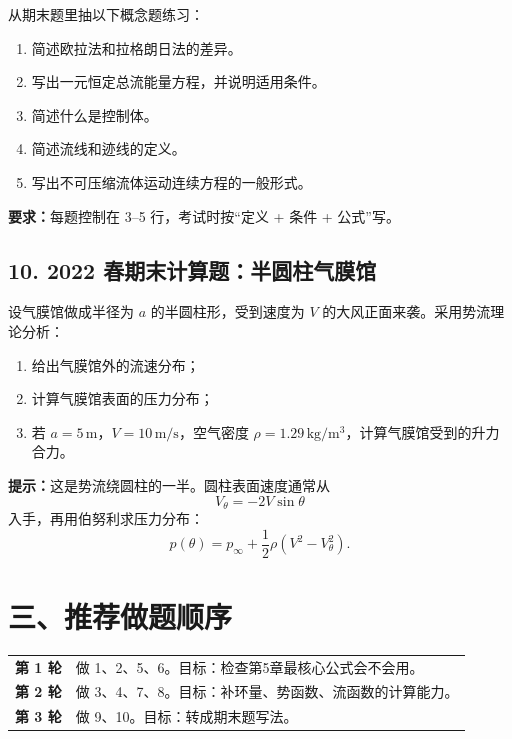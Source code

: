 \documentclass[UTF8,zihao=-4]{ctexart}
\newcommand{\task}[1]{\textbf{#1}}
\begin{document}
从期末题里抽以下概念题练习：

\begin{enumerate}[label=\arabic*.]
  \item 简述欧拉法和拉格朗日法的差异。
  \item 写出一元恒定总流能量方程，并说明适用条件。
  \item 简述什么是控制体。
  \item 简述流线和迹线的定义。
  \item 写出不可压缩流体运动连续方程的一般形式。
\end{enumerate}

\task{要求：}每题控制在 3--5 行，考试时按“定义 + 条件 + 公式”写。

\subsection*{10. 2022 春期末计算题：半圆柱气膜馆}

设气膜馆做成半径为 $a$ 的半圆柱形，受到速度为 $V$ 的大风正面来袭。采用势流理论分析：

\begin{enumerate}[label=(\alph*)]
  \item 给出气膜馆外的流速分布；
  \item 计算气膜馆表面的压力分布；
  \item 若 $a=5\,\mathrm{m}$，$V=10\,\mathrm{m/s}$，空气密度 $\rho=1.29\,\mathrm{kg/m^3}$，计算气膜馆受到的升力合力。
\end{enumerate}

\task{提示：}这是势流绕圆柱的一半。圆柱表面速度通常从
\[
V_\theta=-2V\sin\theta
\]
入手，再用伯努利求压力分布：
\[
p(\theta)=p_\infty+\frac{1}{2}\rho\left(V^2-V_\theta^2\right).
\]

\section*{三、推荐做题顺序}

\begin{tabular}{>{\bfseries}p{3cm}p{9.6cm}}
\toprule
第 1 轮 & 做 1、2、5、6。目标：检查第5章最核心公式会不会用。\\
第 2 轮 & 做 3、4、7、8。目标：补环量、势函数、流函数的计算能力。\\
第 3 轮 & 做 9、10。目标：转成期末题写法。\\
\bottomrule
\end{tabular}
\end{document}
